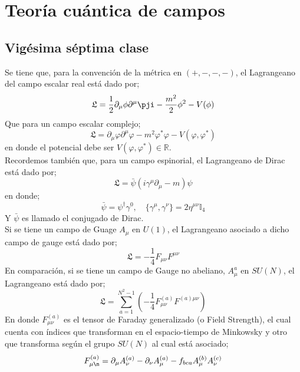 \documentclass[../main.tex]{subfiles}
\begin{document}
\chapter{Teoría cuántica de campos}
\section{Vigésima séptima clase}
Se tiene que, para la convención de la métrica en $(+,-,-,-)$, el Lagrangeano del campo escalar real está dado por;
\begin{equation}
  \mathfrak{L} = \frac{1}{2} \partial_\mu \phi \partial^\mu \pji - \frac{m^2}{2} \phi^2 - V(\phi)
 \end{equation}
Que para un campo escalar complejo;
 \begin{equation}
   \mathfrak{L} = \partial_\mu \varphi \partial^\mu \varphi - m^2 \varphi^* \varphi - V(\varphi,\varphi^*)
 \end{equation} en donde el potencial debe ser $V(\varphi,\varphi^*)\in\mathbb{R}$. \\
 Recordemos también que, para un campo espinorial, el Lagrangeano de Dirac está dado por;
 \begin{equation}
   \mathfrak{L} = \bar{\psi} \left( i\gamma^\mu \partial_\mu - m \right)\psi
  \end{equation}
  en donde;
  \begin{equation}
    \bar{\psi} = \psi^\dagger \gamma^0,\quad \{\gamma^\mu , \gamma^\nu\} = 2\eta^{\mu\nu} \mathbb{I}_4
   \end{equation}
   Y $\bar{\psi}$ es llamado el conjugado de Dirac. \\
   Si se tiene un campo de Guage $A_\mu$ en $U(1)$, el Lagrangeano asociado a dicho campo de gauge está dado por;
   \begin{equation}
     \mathfrak{L} = -\frac{1}{4} F_{\mu\nu}F^{\mu\nu}
    \end{equation}
  En comparación, si se tiene un campo de Gauge no abeliano, $A^a_{\mu}$ en $SU(N)$, el Lagrangeano está dado por;
  \begin{equation}
    \mathfrak{L} = \sum_{a=1}^{N^2-1} \left( -\frac{1}{4} F^{(a)}_{\mu\nu}F^{(a)\mu\nu} \right)
   \end{equation}
   En donde $F^{(a)}_{\mu\nu}$ es el tensor de Faraday generalizado (o Field Strength), el cual cuenta con índices que transforman en el espacio-tiempo de Minkowsky y otro que transforma según el grupo $SU(N)$ al cual está asociado;
   \begin{equation}
     F_{\mu\n}^{(a)} = \partial_\mu A^{(a)}_\nu - \partial_\nu A^{(a)}_{\mu} - f_{bca} A^{(b)}_\mu A^{(c)}_\nu
    \end{equation}
\end{document}
